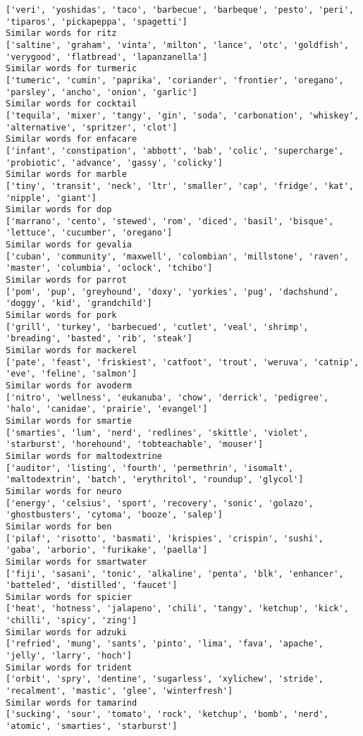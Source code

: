 \documentclass[11pt]{article}
\begin{document}
\begin{Verbatim}[commandchars=\\\{\}]
['veri', 'yoshidas', 'taco', 'barbecue', 'barbeque', 'pesto', 'peri', 'tiparos', 'pickapeppa', 'spagetti']
Similar words for ritz
['saltine', 'graham', 'vinta', 'milton', 'lance', 'otc', 'goldfish', 'verygood', 'flatbread', 'lapanzanella']
Similar words for turmeric
['tumeric', 'cumin', 'paprika', 'coriander', 'frontier', 'oregano', 'parsley', 'ancho', 'onion', 'garlic']
Similar words for cocktail
['tequila', 'mixer', 'tangy', 'gin', 'soda', 'carbonation', 'whiskey', 'alternative', 'spritzer', 'clot']
Similar words for enfacare
['infant', 'constipation', 'abbott', 'bab', 'colic', 'supercharge', 'probiotic', 'advance', 'gassy', 'colicky']
Similar words for marble
['tiny', 'transit', 'neck', 'ltr', 'smaller', 'cap', 'fridge', 'kat', 'nipple', 'giant']
Similar words for dop
['marrano', 'cento', 'stewed', 'rom', 'diced', 'basil', 'bisque', 'lettuce', 'cucumber', 'oregano']
Similar words for gevalia
['cuban', 'community', 'maxwell', 'colombian', 'millstone', 'raven', 'master', 'columbia', 'oclock', 'tchibo']
Similar words for parrot
['pom', 'pup', 'greyhound', 'doxy', 'yorkies', 'pug', 'dachshund', 'doggy', 'kid', 'grandchild']
Similar words for pork
['grill', 'turkey', 'barbecued', 'cutlet', 'veal', 'shrimp', 'breading', 'basted', 'rib', 'steak']
Similar words for mackerel
['pate', 'feast', 'friskiest', 'catfoot', 'trout', 'weruva', 'catnip', 'eve', 'feline', 'salmon']
Similar words for avoderm
['nitro', 'wellness', 'eukanuba', 'chow', 'derrick', 'pedigree', 'halo', 'canidae', 'prairie', 'evangel']
Similar words for smartie
['smarties', 'lum', 'nerd', 'redlines', 'skittle', 'violet', 'starburst', 'horehound', 'tobteachable', 'mouser']
Similar words for maltodextrine
['auditor', 'listing', 'fourth', 'permethrin', 'isomalt', 'maltodextrin', 'batch', 'erythritol', 'roundup', 'glycol']
Similar words for neuro
['energy', 'celsius', 'sport', 'recovery', 'sonic', 'golazo', 'ghostbusters', 'cytoma', 'booze', 'salep']
Similar words for ben
['pilaf', 'risotto', 'basmati', 'krispies', 'crispin', 'sushi', 'gaba', 'arborio', 'furikake', 'paella']
Similar words for smartwater
['fiji', 'sasani', 'tonic', 'alkaline', 'penta', 'blk', 'enhancer', 'batteled', 'distilled', 'faucet']
Similar words for spicier
['heat', 'hotness', 'jalapeno', 'chili', 'tangy', 'ketchup', 'kick', 'chilli', 'spicy', 'zing']
Similar words for adzuki
['refried', 'mung', 'sants', 'pinto', 'lima', 'fava', 'apache', 'jelly', 'larry', 'hoch']
Similar words for trident
['orbit', 'spry', 'dentine', 'sugarless', 'xylichew', 'stride', 'recalment', 'mastic', 'glee', 'winterfresh']
Similar words for tamarind
['sucking', 'sour', 'tomato', 'rock', 'ketchup', 'bomb', 'nerd', 'atomic', 'smarties', 'starburst']

\end{Verbatim}
\end{document}

